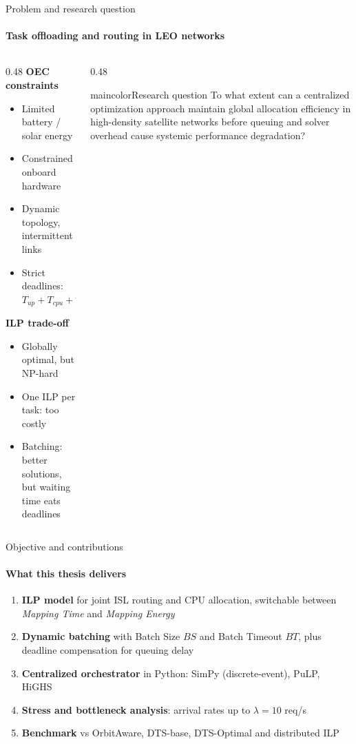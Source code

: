 \documentclass{beamer}
\newcommand{\lam}{\lambda}
\newcommand{\bs}{\mathit{BS}}
\newcommand{\bt}{\mathit{BT}}
\begin{document}
\begin{frame}{Problem and research question}
\framesubtitle{Task offloading and routing in LEO networks}
\begin{columns}[T]
\begin{column}{0.48\textwidth}
\small
\textbf{OEC constraints}
\begin{itemize}\setlength\itemsep{2pt}
  \item Limited battery / solar energy
  \item Constrained onboard hardware
  \item Dynamic topology, intermittent links
  \item Strict deadlines: \\ $T_{up}+T_{cpu}+T_{down}\le D_r$
\end{itemize}
\vspace{2pt}
\textbf{ILP trade-off}
\begin{itemize}\setlength\itemsep{2pt}
  \item Globally optimal, but NP-hard
  \item One ILP per task: too costly
  \item Batching: better solutions, but \alert{waiting time} eats deadlines
\end{itemize}
\end{column}
\begin{column}{0.48\textwidth}
\vspace{6pt}
\begin{colorblock}{maincolor}{Research question}
\small To what extent can a centralized optimization approach maintain global allocation efficiency in high-density satellite networks before queuing and solver overhead cause systemic performance degradation?
\end{colorblock}
\end{column}
\end{columns}
\end{frame}

\begin{frame}{Objective and contributions}
\framesubtitle{What this thesis delivers}
\begin{enumerate}\setlength\itemsep{4pt}
  \item \textbf{ILP model} for joint ISL routing and CPU allocation, switchable between \emph{Mapping Time} and \emph{Mapping Energy}
  \item \textbf{Dynamic batching} with Batch Size $\bs$ and Batch Timeout $\bt$, plus deadline compensation for queuing delay
  \item \textbf{Centralized orchestrator} in Python: SimPy (discrete-event), PuLP, HiGHS
  \item \textbf{Stress and bottleneck analysis}: arrival rates up to $\lam=10$ req/s
  \item \textbf{Benchmark} vs OrbitAware, DTS-base, DTS-Optimal and distributed ILP
\end{enumerate}
\end{frame}
\end{document}

